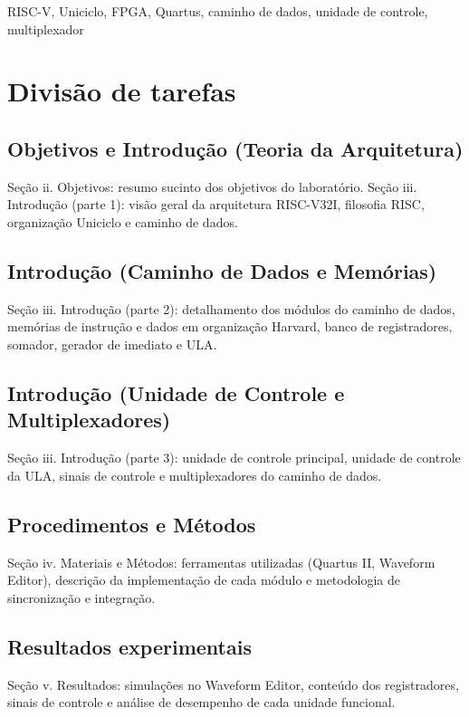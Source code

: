\documentclass[conference]{IEEEtran}
\begin{document}
\begin{IEEEkeywords}
RISC-V, Uniciclo, FPGA, Quartus, caminho de dados, unidade de controle, multiplexador
\end{IEEEkeywords}


\section{Divisão de tarefas}

\subsection{Objetivos e Introdução (Teoria da Arquitetura)}
Seção ii. Objetivos: resumo sucinto dos objetivos do laboratório.
Seção iii. Introdução (parte 1): visão geral da arquitetura RISC-V32I, filosofia RISC, organização
Uniciclo e caminho de dados.

\subsection{Introdução (Caminho de Dados e Memórias)}
Seção iii. Introdução (parte 2): detalhamento dos módulos do caminho de dados, memórias de instrução e
dados em organização Harvard, banco de registradores, somador, gerador de imediato e ULA.

\subsection{Introdução (Unidade de Controle e Multiplexadores)}
Seção iii. Introdução (parte 3): unidade de controle principal, unidade de controle da ULA, sinais de
controle e multiplexadores do caminho de dados.

\subsection{Procedimentos e Métodos}
Seção iv. Materiais e Métodos: ferramentas utilizadas (Quartus II, Waveform Editor), descrição da
implementação de cada módulo e metodologia de sincronização e integração.

\subsection{Resultados experimentais}
Seção v. Resultados: simulações no Waveform Editor, conteúdo dos registradores, sinais de controle e
análise de desempenho de cada unidade funcional.
\end{document}

